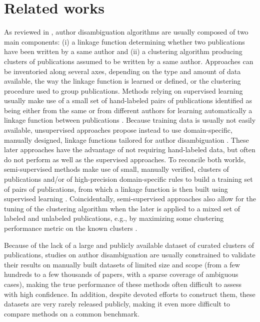 \documentclass{article}
\begin{document}

\section{Related works}
\label{related-works}

As reviewed in
\citep{smalheiser2009author,ferreira2012brief,levin2012citation}, author
disambiguation algorithms are usually composed of two main components: (i) a
linkage function determining whether two publications have been written by a
same author and (ii) a clustering algorithm producing clusters of publications
assumed to be written by a same author. Approaches can be inventoried along
several axes, depending on the type and amount of data available, the way the
linkage function is learned or defined, or the clustering procedure used to
group publications. Methods relying on supervised learning usually make use of
a small set of
hand-labeled pairs of publications identified as being either from the same or
from different authors for learning automatically a linkage function between
publications \citep{han2004two,huang2006efficient,
culotta2007author,treeratpituk2009disambiguating,tran2014author}. Because
training data is usually not easily available, unsupervised approaches propose
instead to use domain-specific,  manually designed, linkage functions tailored for author
disambiguation \citep{malin2005unsupervised,mcrae2006also,song2007efficient,
soler2007separating, kang2009co,fan2011graph,schulz2014exploiting}. These later
approaches have the advantage of not requiring  hand-labeled data, but often do
not perform as well as the supervised approaches. To reconcile both worlds,
semi-supervised methods make use of small, manually verified, clusters of
publications and/or of high-precision domain-specific rules to build a training
set of pairs of publications, from which a linkage function is then built
using supervised learning
\citep{ferreira2010effective,torvik2009author,levin2012citation}.
Coincidentally, semi-supervised approaches also allow for the tuning of the
clustering algorithm when the later is applied to a mixed set of labeled
and unlabeled publications, e.g., by maximizing some clustering performance
metric on the known clusters \citep{levin2012citation}.

Because of the lack of a large and publicly available dataset of curated
clusters of publications, studies on author disambiguation are usually
constrained to validate their results on manually built datasets of limited
size and scope (from a few hundreds to a few thousands of papers, with a sparse
coverage of ambiguous cases), making the true performance of these methods
often difficult to assess with high confidence. In addition, despite devoted
efforts to construct them, these datasets are very rarely released publicly,
making it even more difficult to compare methods on a common benchmark.
\end{document}
